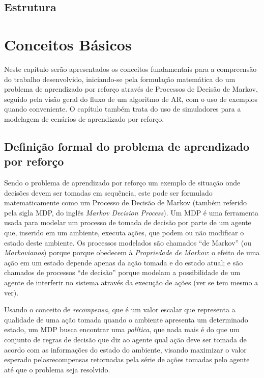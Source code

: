 \documentclass[cic,tc]{iiufrgs}
\begin{document}
\section{Estrutura}
\blindtext


\chapter{Conceitos Básicos}
\label{basic_concepts}
Neste capítulo serão apresentados os conceitos fundamentais para a compreensão
do trabalho desenvolvido, iniciando-se pela formulação matemática do um problema
de aprendizado por reforço através de Processos de Decisão de Markov, seguido
pela visão geral do fluxo de um algoritmo de AR, com o uso de exemplos quando
conveniente. O capítulo também trata do uso de simuladores para a modelagem de
cenários de aprendizado por reforço.

\section{Definição formal do problema de aprendizado por reforço}
\label{markov_process}
Sendo o problema de aprendizado por reforço um exemplo de situação onde decisões
devem ser tomadas em sequência, este pode ser formulado matematicamente como um
Processo de Decisão de Markov (também referido pela sigla MDP, do inglês
\textit{Markov Decision Process}). Um MDP é uma ferramenta usada para modelar
um processo de tomada de decisão por parte de um agente que, inserido em um
ambiente, executa ações, que podem ou não modificar o estado deste ambiente.
Os processos modelados são chamados ``de Markov'' (ou \textit{Markovianos}) porque
porque obedecem à \textit{Propriedade de Markov}: o efeito de uma ação em um
estado depende apenas da ação tomada e do estado atual; e são chamados de
processos ``de decisão''  porque modelam a possibilidade de um agente de
interferir no sistema através da execução de ações \cite{Bellman1957} (ver se tem
mesmo a ver).


Usando o conceito de \textit{recompensa}, que é um valor escalar que representa a
qualidade de uma ação tomada quando o ambiente apresenta um determinado estado,
um MDP busca encontrar uma \textit{política}, que nada mais é do que um
conjunto de regras de decisão que diz ao agente qual ação deve ser tomada de
acordo com as informações do estado do ambiente, visando maximizar o valor
esperado pelasrecompensas retornadas pela série de ações tomadas pelo agente até
que o problema seja resolvido.
\end{document}
